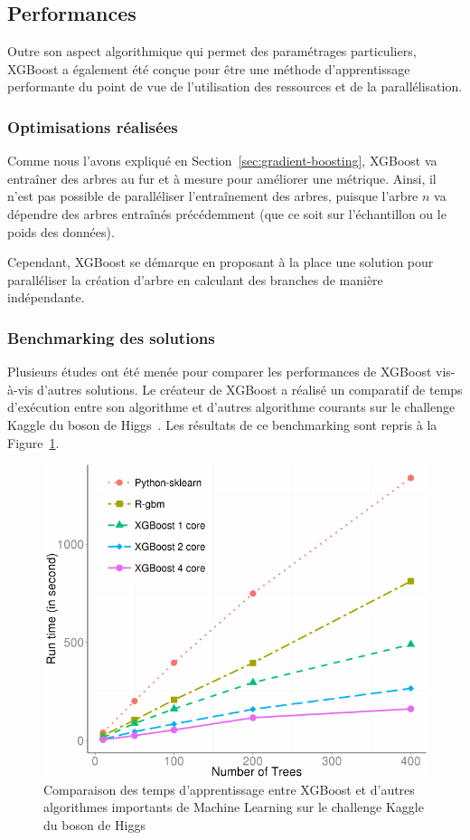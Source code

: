 \subsection{Performances}
\label{sec:perf}
Outre son aspect algorithmique qui permet des paramétrages particuliers, XGBoost a également été conçue pour être une méthode d'apprentissage performante du point de vue de l'utilisation des ressources et de la parallélisation.
\subsubsection{Optimisations réalisées}
Comme nous l'avons expliqué en Section~\ref{sec:gradient-boosting}, XGBoost va entraîner des arbres au fur et à mesure pour améliorer une métrique. Ainsi, il n'est pas possible de paralléliser l'entraînement des arbres, puisque l'arbre $n$ va dépendre des arbres entraînés précédemment (que ce soit sur l'échantillon ou le poids des données).

Cependant, XGBoost se démarque en proposant à la place une solution pour paralléliser la création d'arbre en calculant des branches de manière indépendante.
\subsubsection{Benchmarking des solutions}
Plusieurs études ont été menée pour comparer les performances de XGBoost vis-à-vis d'autres solutions.
Le créateur de XGBoost a réalisé un comparatif de temps d'exécution entre son algorithme et d'autres algorithme courants sur le challenge Kaggle du boson de Higgs~\cite{bib:boson}. Les résultats de ce benchmarking sont repris à la Figure~\ref{fig:perfun}.

\begin{figure}[h]
	\begin{margincap}
		\centering
		\includegraphics[width=.6\textwidth]{images/More/perf_un}
		\caption{Comparaison des temps d'apprentissage entre XGBoost et d'autres algorithmes importants de Machine Learning sur le challenge Kaggle du boson de Higgs}
		\label{fig:perfun}
	\end{margincap}
\end{figure}

